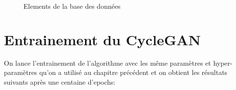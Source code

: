 \begin{figure}[H]
    \centering
    \qquad
    \caption{Elements de la base des données}%
    \label{fig:example}%
\end{figure}

\section{Entrainement du CycleGAN}
On lance l'entrainement de l'algorithme avec les même paramètres et hyper-paramètres qu'on a utilisé au chapitre précédent et on obtient les résultats suivants après une centaine d'epochs:

